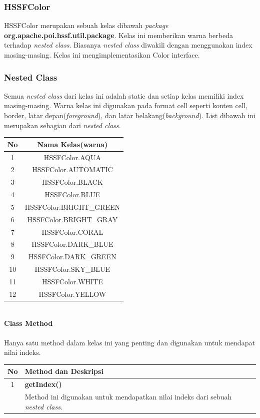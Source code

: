 \subsubsection{HSSFColor}
HSSFColor merupakan sebuah kelas dibawah \textit{package} \textbf{org.apache.poi.hssf.util.package}. Kelas ini memberikan warna berbeda terhadap \textit{nested class}. Biasanya \textit{nested class} diwakili dengan menggunakan index masing-masing. Kelas ini mengimplementasikan Color interface.\cite{apachepoi2}

	
\subsubsection{Nested Class}
Semua \textit{nested class} dari kelas ini adalah static dan setiap kelas memiliki index masing-masing. Warna kelas ini digunakan pada format cell seperti konten cell, border, latar depan(\textit{foreground}), dan latar belakang(\textit{background}). List dibawah ini merupakan sebagian dari \textit{nested class}.\cite{apachepoi2}

\begin{tabular}{|c|c|}
		\hline
		\textbf{No} & \textbf{Nama Kelas(warna)} \\ \hline \hline
		1 & HSSFColor.AQUA\\ \hline 
		2 &	HSSFColor.AUTOMATIC\\ \hline 
		3 & HSSFColor.BLACK \\ \hline
		4	&	HSSFColor.BLUE\\ \hline
		5	&	HSSFColor.BRIGHT\_GREEN\\ \hline
		6 &	HSSFColor.BRIGHT\_GRAY\\ \hline
		7 &	HSSFColor.CORAL \\ \hline
		8 &	HSSFColor.DARK\_BLUE\\ \hline
		9 &	HSSFColor.DARK\_GREEN\\ \hline
		10 &	HSSFColor.SKY\_BLUE\\ \hline
		11 &	HSSFColor.WHITE\\ \hline
		12 &	HSSFColor.YELLOW\\ \hline
	\end{tabular}
	\\
	\noindent \textbf{Class Method}\\ \\
	Hanya satu method dalam kelas ini yang penting dan digunakan untuk mendapat nilai indeks.\\
	\begin{tabular}{|c|p{12cm}|}
		\hline
		\textbf{No} & \textbf{Method dan Deskripsi} \\ \hline \hline
		1 & \textbf{getIndex()}\\
			&	Method ini digunakan untuk mendapatkan nilai indeks dari sebuah \textit{nested class}.\\ \hline 
	\end{tabular}
	
